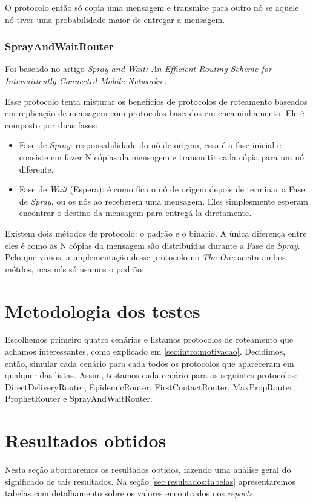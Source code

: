 \documentclass[conference]{IEEEtran}
\begin{document}
O protocolo então só copia uma mensagem e transmite para outro nó se aquele nó tiver uma probabilidade maior de entregar a mensagem.

\subsubsection{SprayAndWaitRouter}
Foi baseado no artigo \textit{Spray and Wait: An Efficient Routing Scheme for Intermittently Connected Mobile Networks} \cite{SprayAndWaitRouter:original}.

Esse protocolo tenta misturar os benefícios de protocolos de roteamento baseados em replicação de mensagem com protocolos baseados em encaminhamento. Ele é composto por duas fases:
\begin{itemize}
  \item Fase de \textit{Spray}: responsabilidade do nó de origem, essa é a fase inicial e consiste em fazer N cópias da mensagem e transmitir cada cópia para um nó diferente.
  \item Fase de \textit{Wait} (Espera): é como fica o nó de origem depois de terminar a Fase de \textit{Spray}, ou os nós ao receberem uma mensagem. Eles simplesmente esperam encontrar o destino da mensagem para entregá-la diretamente.
\end{itemize}

Existem dois métodos de protocolo: o padrão e o binário. A única diferença entre eles é como as N cópias da mensagem são distribuídas durante a Fase de \textit{Spray}. Pelo que vimos, a implementação desse protocolo no \emph{The One} aceita ambos métdos, mas nós só usamos o padrão.

\section{Metodologia dos testes}
Escolhemos primeiro quatro cenários e listamos protocolos de roteamento que achamos interessantes, como explicado em \ref{sec:intro:motivacao}. Decidimos, então, simular cada cenário para cada todos os protocolos que apareceram em qualquer das listas. Assim, testamos cada cenário para os seguintes protocolos: DirectDeliveryRouter, EpidemicRouter, FirstContactRouter, MaxPropRouter, ProphetRouter e SprayAndWaitRouter.


\section{Resultados obtidos}
Nesta seção abordaremos os resultados obtidos, fazendo uma análise geral do significado de tais resultados. Na seção \ref{sec:resultados:tabelas} apresentaremos tabelas com detalhamento sobre os valores encontrados nos \textit{reports}.
\end{document}

